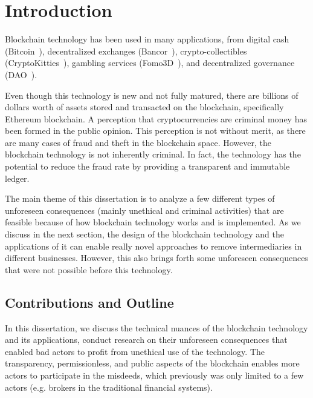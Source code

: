 


\chapter{Introduction} \label{sec:intro}

Blockchain technology has been used in many applications, from digital cash (\eg Bitcoin~\cite{nakamoto2008bitcoin}), decentralized exchanges (\eg Bancor~\cite{hertzog2017bancor}), crypto-collectibles (\eg CryptoKitties~\cite{cryptokitties}), gambling services (\eg Fomo3D~\cite{fomo3dmedium}), and decentralized governance~\cite{aragonwebsite} (\eg DAO~\cite{wang2019decentralized,siegel2016daohack}).

Even though this technology is new and not fully matured, there are billions of dollars worth of assets stored and transacted on the blockchain, specifically Ethereum blockchain. A perception that cryptocurrencies are criminal money has been formed in the public opinion. This perception is not without merit, as there are many cases of fraud and theft in the blockchain space. However, the blockchain technology is not inherently criminal. In fact, the technology has the potential to reduce the fraud rate by providing a transparent and immutable ledger.

The main theme of this dissertation is to analyze a few different types of unforeseen consequences (mainly unethical and criminal activities) that are feasible because of how blockchain technology works and is implemented. As we discuss in the next section, the design of the blockchain technology and the applications of it can enable really novel approaches to remove intermediaries in different businesses. However, this also brings forth some unforeseen consequences that were not possible before this technology.


\section{Contributions and Outline} 
In this dissertation, we discuss the technical nuances of the blockchain technology and its applications, conduct research on their unforeseen consequences that enabled bad actors to profit from unethical use of the technology. The transparency, permissionless, and public aspects of the blockchain enables more actors to participate in the misdeeds, which previously was only limited to a few actors (e.g. brokers in the traditional financial systems). 

